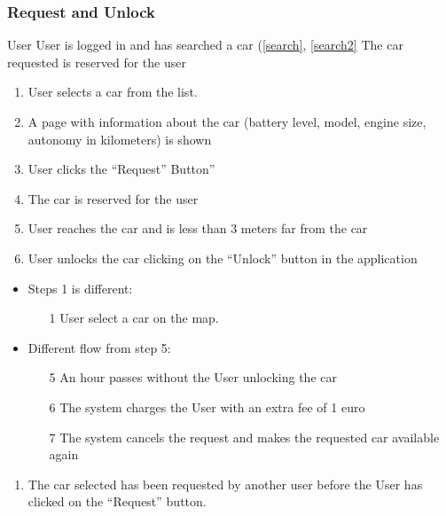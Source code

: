 \subsubsection{Request and Unlock}\label{request}
{User}
{ \newline {} \newline {}}
{User is logged in and has searched a car (\ref{search}, \ref{search2}}
{The car requested is reserved for the user}
{
\begin{enumerate}
	\item User selects a car from the list. 
	\item A page with information about the car (battery level, model, engine size, autonomy in kilometers) is shown
	\item User clicks the ``Request'' Button''
	\item The car is reserved for the user
	\item User reaches the car and is less than 3 meters far from the car
	\item User unlocks the car clicking on the ``Unlock'' button in the application

\end{enumerate}
}
{
\begin{itemize}
\item Steps 1 is different:
	\begin{enumerate}
	\item[1] User select a car on the map.   
	\end{enumerate}
\item Different flow from step 5:
	\begin{enumerate}
	\item[5] An hour passes without the User unlocking the car
	\item[6]The system charges the User with an extra fee of 1 euro
	\item [7]The system cancels the request and makes the requested car available again
	\end{enumerate}
\end{itemize}


}
{
\begin{enumerate}
\item The car selected has been requested by another user before the User has clicked on the ``Request'' button.
\end{enumerate}
}
\pagebreak


